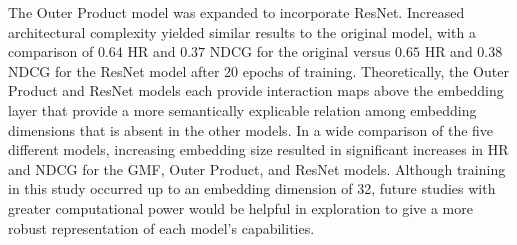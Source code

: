 \documentclass{article}
\begin{document}
The Outer Product model was expanded to incorporate ResNet. Increased architectural complexity yielded similar results to the original model, with a comparison of $0.64$ HR and $0.37$ NDCG for the original versus $0.65$ HR and $0.38$ NDCG for the ResNet model after 20 epochs of training. Theoretically, the Outer Product and ResNet models each provide interaction maps above the embedding layer that provide a more semantically explicable relation among embedding dimensions that is absent in the other models. In a wide comparison of the five different models, increasing embedding size resulted in significant increases in HR and NDCG for the GMF, Outer Product, and ResNet models. Although training in this study occurred up to an embedding dimension of 32, future studies with greater computational power would be helpful in exploration to give a more robust representation of each model’s capabilities. \\




%
%
%
%
%
%
\end{document}
